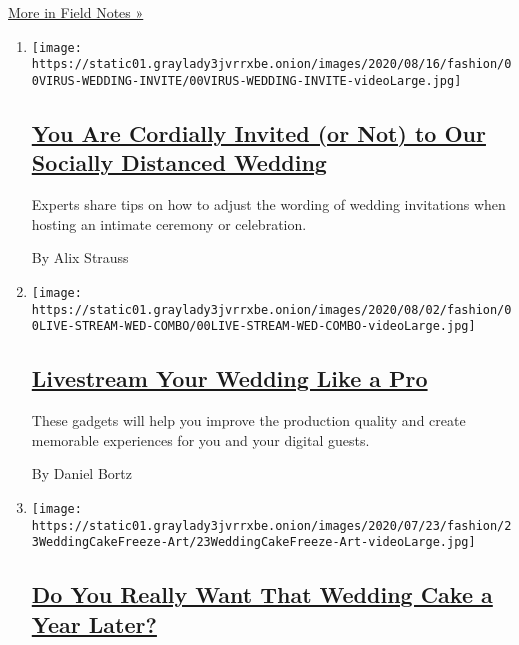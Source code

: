 \href{/column/field-notes}{More in Field Notes »}

\begin{enumerate}
\def\labelenumi{\arabic{enumi}.}
\item
  \texttt{[image: https://static01.graylady3jvrrxbe.onion/images/2020/08/16/fashion/00VIRUS-WEDDING-INVITE/00VIRUS-WEDDING-INVITE-videoLarge.jpg]}

  \hypertarget{you-are-cordially-invited-or-not-to-our-socially-distanced-wedding}{%
  \subsection{\texorpdfstring{\href{/2020/08/11/fashion/weddings/how-to-invite-guests-socially-distanced-wedding.html}{You
  Are Cordially Invited (or Not) to Our Socially Distanced
  Wedding}}{You Are Cordially Invited (or Not) to Our Socially Distanced Wedding}}\label{you-are-cordially-invited-or-not-to-our-socially-distanced-wedding}}

  Experts share tips on how to adjust the wording of wedding invitations
  when hosting an intimate ceremony or celebration.

  By Alix Strauss
\item
  \texttt{[image: https://static01.graylady3jvrrxbe.onion/images/2020/08/02/fashion/00LIVE-STREAM-WED-COMBO/00LIVE-STREAM-WED-COMBO-videoLarge.jpg]}

  \hypertarget{livestream-your-wedding-like-a-pro}{%
  \subsection{\texorpdfstring{\href{/2020/07/28/fashion/weddings/livestream-your-wedding-like-a-pro.html}{Livestream
  Your Wedding Like a
  Pro}}{Livestream Your Wedding Like a Pro}}\label{livestream-your-wedding-like-a-pro}}

  These gadgets will help you improve the production quality and create
  memorable experiences for you and your digital guests.

  By Daniel Bortz
\item
  \texttt{[image: https://static01.graylady3jvrrxbe.onion/images/2020/07/23/fashion/23WeddingCakeFreeze-Art/23WeddingCakeFreeze-Art-videoLarge.jpg]}

  \hypertarget{do-you-really-want-that-wedding-cake-a-year-later}{%
  \subsection{\texorpdfstring{\href{/2020/07/22/fashion/weddings/do-you-really-want-that-wedding-cake-a-year-later.html}{Do
  You Really Want That Wedding Cake a Year
  Later?}}{Do You Really Want That Wedding Cake a Year Later?}}\label{do-you-really-want-that-wedding-cake-a-year-later}}


\end{enumerate}
